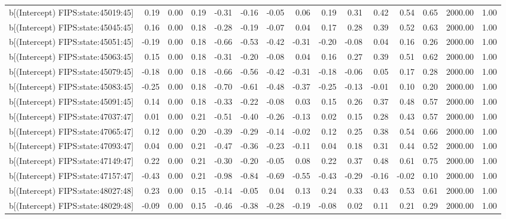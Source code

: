 \begin{table}[ht]
\begin{tabular}{rrrrrrrrrrrrrrr}
  b[(Intercept) FIPS:state:45019:45] & 0.19 & 0.00 & 0.19 & -0.31 & -0.16 & -0.05 & 0.06 & 0.19 & 0.31 & 0.42 & 0.54 & 0.65 & 2000.00 & 1.00 \\ 
  b[(Intercept) FIPS:state:45045:45] & 0.16 & 0.00 & 0.18 & -0.28 & -0.19 & -0.07 & 0.04 & 0.17 & 0.28 & 0.39 & 0.52 & 0.63 & 2000.00 & 1.00 \\ 
  b[(Intercept) FIPS:state:45051:45] & -0.19 & 0.00 & 0.18 & -0.66 & -0.53 & -0.42 & -0.31 & -0.20 & -0.08 & 0.04 & 0.16 & 0.26 & 2000.00 & 1.00 \\ 
  b[(Intercept) FIPS:state:45063:45] & 0.15 & 0.00 & 0.18 & -0.31 & -0.20 & -0.08 & 0.04 & 0.16 & 0.27 & 0.39 & 0.51 & 0.62 & 2000.00 & 1.00 \\ 
  b[(Intercept) FIPS:state:45079:45] & -0.18 & 0.00 & 0.18 & -0.66 & -0.56 & -0.42 & -0.31 & -0.18 & -0.06 & 0.05 & 0.17 & 0.28 & 2000.00 & 1.00 \\ 
  b[(Intercept) FIPS:state:45083:45] & -0.25 & 0.00 & 0.18 & -0.70 & -0.61 & -0.48 & -0.37 & -0.25 & -0.13 & -0.01 & 0.10 & 0.20 & 2000.00 & 1.00 \\ 
  b[(Intercept) FIPS:state:45091:45] & 0.14 & 0.00 & 0.18 & -0.33 & -0.22 & -0.08 & 0.03 & 0.15 & 0.26 & 0.37 & 0.48 & 0.57 & 2000.00 & 1.00 \\ 
  b[(Intercept) FIPS:state:47037:47] & 0.01 & 0.00 & 0.21 & -0.51 & -0.40 & -0.26 & -0.13 & 0.02 & 0.15 & 0.28 & 0.43 & 0.57 & 2000.00 & 1.00 \\ 
  b[(Intercept) FIPS:state:47065:47] & 0.12 & 0.00 & 0.20 & -0.39 & -0.29 & -0.14 & -0.02 & 0.12 & 0.25 & 0.38 & 0.54 & 0.66 & 2000.00 & 1.00 \\ 
  b[(Intercept) FIPS:state:47093:47] & 0.04 & 0.00 & 0.21 & -0.47 & -0.36 & -0.23 & -0.11 & 0.04 & 0.18 & 0.31 & 0.44 & 0.52 & 2000.00 & 1.00 \\ 
  b[(Intercept) FIPS:state:47149:47] & 0.22 & 0.00 & 0.21 & -0.30 & -0.20 & -0.05 & 0.08 & 0.22 & 0.37 & 0.48 & 0.61 & 0.75 & 2000.00 & 1.00 \\ 
  b[(Intercept) FIPS:state:47157:47] & -0.43 & 0.00 & 0.21 & -0.98 & -0.84 & -0.69 & -0.55 & -0.43 & -0.29 & -0.16 & -0.02 & 0.10 & 2000.00 & 1.00 \\ 
  b[(Intercept) FIPS:state:48027:48] & 0.23 & 0.00 & 0.15 & -0.14 & -0.05 & 0.04 & 0.13 & 0.24 & 0.33 & 0.43 & 0.53 & 0.61 & 2000.00 & 1.00 \\ 
  b[(Intercept) FIPS:state:48029:48] & -0.09 & 0.00 & 0.15 & -0.46 & -0.38 & -0.28 & -0.19 & -0.08 & 0.02 & 0.11 & 0.21 & 0.29 & 2000.00 & 1.00 \\ 

\end{tabular}
\end{table}
